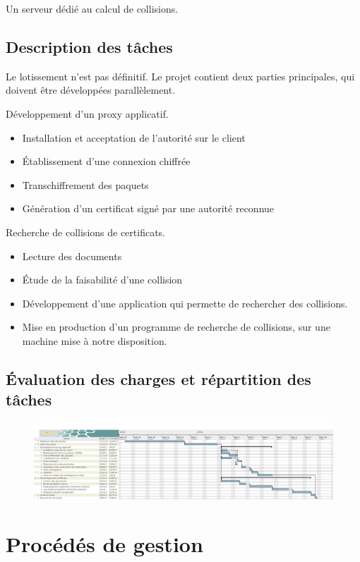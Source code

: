 \documentclass[a4paper,11pt,french]{article}
\begin{document}
Un serveur dédié au calcul de collisions.

\subsection{Description des tâches}

Le lotissement n'est pas définitif. Le projet contient deux parties principales, qui doivent être développées parallèlement.

Développement d'un proxy applicatif.
\begin{itemize}
\item Installation et acceptation de l'autorité sur le client
\item Établissement d'une connexion chiffrée
\item Transchiffrement des paquets
\item Génération d'un certificat signé par une autorité reconnue
\end{itemize}
Recherche de collisions de certificats.
\begin{itemize}
\item Lecture des documents
\item Étude de la faisabilité d'une collision
\item Développement d'une application qui permette de rechercher des collisions.
\item Mise en production d'un programme de recherche de collisions, sur une machine mise à notre disposition.
\end{itemize}
\subsection{Évaluation des charges et répartition des tâches}

\begin{figure}[h!]
\includegraphics[width=\textheight, angle=90]{planification.png}
\end{figure}

\newpage
\section{Procédés de gestion}
\end{document}
